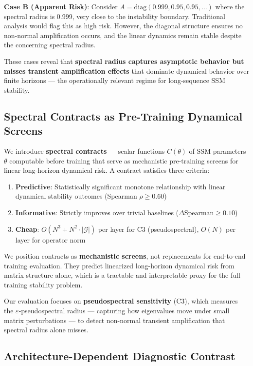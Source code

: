 \documentclass[twoside]{article}
\begin{document}
\textbf{Case B (Apparent Risk)}: Consider $A = \text{diag}(0.999, 0.95, 0.95, ...)$ where the spectral radius is 0.999, very close to the instability boundary. Traditional analysis would flag this as high risk. However, the diagonal structure ensures no non-normal amplification occurs, and the linear dynamics remain stable despite the concerning spectral radius.

These cases reveal that \textbf{spectral radius captures asymptotic behavior but misses transient amplification effects} that dominate dynamical behavior over finite horizons — the operationally relevant regime for long-sequence SSM stability.

\subsection{Spectral Contracts as Pre-Training Dynamical Screens}

We introduce \textbf{spectral contracts} — scalar functions $C(\theta)$ of SSM parameters $\theta$ computable before training that serve as mechanistic pre-training screens for linear long-horizon dynamical risk. A contract satisfies three criteria:

\begin{enumerate}
\item \textbf{Predictive}: Statistically significant monotone relationship with linear dynamical stability outcomes (Spearman $\rho \geq 0.60$)
\item \textbf{Informative}: Strictly improves over trivial baselines ($\Delta\text{Spearman} \geq 0.10$)
\item \textbf{Cheap}: $O(N^3 + N^2 \cdot |\mathcal{G}|)$ per layer for C3 (pseudospectral), $O(N)$ per layer for operator norm
\end{enumerate}

We position contracts as \textbf{mechanistic screens}, not replacements for end-to-end training evaluation. They predict linearized long-horizon dynamical risk from matrix structure alone, which is a tractable and interpretable proxy for the full training stability problem.

Our evaluation focuses on \textbf{pseudospectral sensitivity} (C3), which measures the $\varepsilon$-pseudospectral radius — capturing how eigenvalues move under small matrix perturbations — to detect non-normal transient amplification that spectral radius alone misses.

\subsection{Architecture-Dependent Diagnostic Contrast}
\end{document}
